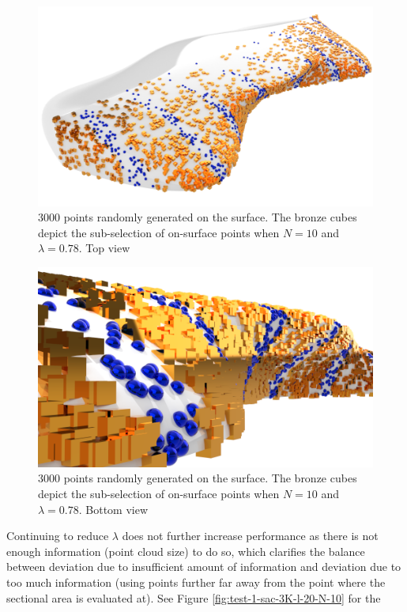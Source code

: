 \documentclass{report}
\begin{document}
\begin{figure}[H]
    \centering
    \includegraphics[width=1.0\linewidth]{figures/test-1-wigley-render-3K-l-78-N-10-1.png}
    \caption{3000 points randomly generated on the surface. The bronze cubes depict the sub-selection
    of on-surface points when $N=10$ and $\lambda = 0.78$. Top view}
    \label{fig:test-1-wigley-render-3K-l-78-N-10-1}
\end{figure}
\begin{figure}[H]
    \centering
    \includegraphics[width=0.7\linewidth]{figures/test-1-wigley-render-3K-l-78-N-10-2.png}
    \caption{3000 points randomly generated on the surface. The bronze cubes depict the sub-selection
    of on-surface points when $N=10$ and $\lambda = 0.78$. Bottom view}
    \label{fig:test-1-wigley-render-3K-l-78-N-10-2}
\end{figure}
\newpar Continuing to reduce $\lambda$ does not further increase performance as there is 
not enough information (point cloud size) to do so, which clarifies the balance between 
deviation due to insufficient amount of information and deviation due to too much information (using 
points further far away from the point where the sectional area is evaluated at). See Figure \ref{fig:test-1-sac-3K-l-20-N-10} for the
\end{document}

